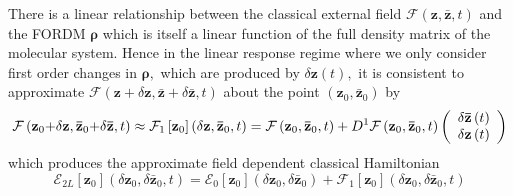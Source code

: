 \documentclass[aps,preprint]{revtex4}%
\begin{document}
There is a linear relationship between the classical external field
$\mathcal{F}\left(  \mathbf{z},\mathbf{\bar{z}},t\right)  $ and the FORDM
$\mathbf{\rho}$ which is itself a linear function of the full density matrix
of the molecular system. Hence in the linear response regime where we only
consider first order changes in $\mathbf{\rho,}$ which are produced by
$\delta\mathbf{z}\left(  t\right)  ,$ it is consistent to approximate
$\mathcal{F}\left(  \mathbf{z+}\delta\mathbf{z},\mathbf{\bar{z}+}%
\delta\mathbf{\bar{z}},t\right)  $ about the point $\left(  \mathbf{z}%
_{0},\mathbf{\bar{z}}_{0}\right)  $ by
\begin{equation}
\mathcal{F}\left(  \mathbf{z}_{0}\mathbf{+}\delta\mathbf{z},\mathbf{\bar{z}%
}_{0}\mathbf{+}\delta\mathbf{\bar{z}},t\right)  \approx\mathcal{F}_{1}\left[
\mathbf{z}_{0}\right]  \left(  \delta\mathbf{z},\mathbf{\bar{z}}_{0},t\right)
=\mathcal{F}\left(  \mathbf{z}_{0},\mathbf{\bar{z}}_{0},t\right)
+D^{1}\mathcal{F}\left(  \mathbf{z}_{0},\mathbf{\bar{z}}_{0},t\right)  \left(
%
\begin{array}
[c]{c}%
\delta\mathbf{\bar{z}}\left(  t\right)  \\
\delta\mathbf{z}\left(  t\right)
\end{array}
\right)
\end{equation}
which produces the approximate field dependent classical Hamiltonian
\begin{equation}
\mathcal{E}_{2L}\left[  \mathbf{z}_{0}\right]  \left(  \delta\mathbf{z}%
_{0},\delta\mathbf{\bar{z}}_{0},t\right)  =\mathcal{E}_{0}\left[
\mathbf{z}_{0}\right]  \left(  \delta\mathbf{z}_{0},\delta\mathbf{\bar{z}}%
_{0}\right)  +\mathcal{F}_{1}\left[  \mathbf{z}_{0}\right]  \left(
\delta\mathbf{z}_{0},\delta\mathbf{\bar{z}}_{0},t\right)
\end{equation}
\end{document}
